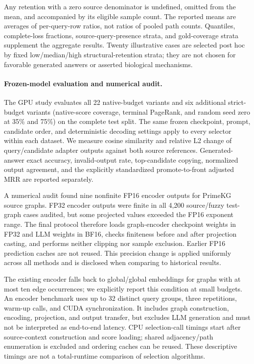 Any retention with a zero source denominator is undefined, omitted from the
mean, and accompanied by its eligible sample count. The reported means are
averages of per-query-row ratios, not ratios of pooled path counts. Quantiles,
complete-loss fractions, source-query-presence strata, and gold-coverage strata
supplement the aggregate results. Twenty illustrative cases are selected
post hoc by fixed low/median/high structural-retention strata; they are not chosen
for favorable generated answers or asserted biological mechanisms.

\paragraph{Frozen-model evaluation and numerical audit.}
The GPU study evaluates all 22 native-budget variants and six additional
strict-budget variants (native-score coverage, terminal PageRank, and random
seed zero at 35\% and 75\%) on the complete test split. The same frozen
checkpoint, prompt, candidate order, and deterministic decoding settings apply
to every selector within each dataset. We measure cosine similarity and
relative L2 change of query/candidate adapter outputs against both source
references. Generated-answer exact accuracy, invalid-output rate, top-candidate
copying, normalized output agreement, and the explicitly standardized
promote-to-front adjusted MRR are reported separately.

A numerical audit found nine nonfinite FP16 encoder outputs for PrimeKG source
graphs. FP32 encoder outputs were finite in all 4,200 source/fuzzy test-graph
cases audited, but some projected values exceeded the FP16 exponent range.
The final protocol therefore loads graph-encoder checkpoint weights in FP32
and LLM weights in BF16, checks finiteness before and after projection casting,
and performs neither clipping nor sample exclusion. Earlier FP16 prediction
caches are not reused. This precision change is applied uniformly across all
methods and is disclosed when comparing to historical results.

The existing encoder falls back to global/global embeddings for graphs with at
most ten edge occurrences; we explicitly report this condition at small
budgets. An encoder benchmark uses up to 32 distinct query groups, three
repetitions, warm-up calls, and CUDA synchronization. It includes graph
construction, encoding, projection, and output transfer, but excludes LLM
generation and must not be interpreted as end-to-end latency.
CPU selection-call timings start after source-context construction and score
loading; shared adjacency/path enumeration is excluded and ordering caches can
be reused. These descriptive timings are not a total-runtime comparison of
selection algorithms.


